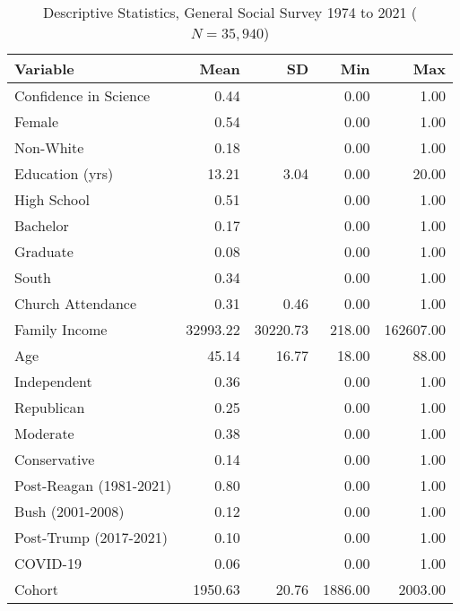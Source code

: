 \begin{table}[ht]
\centering
\caption{Descriptive Statistics, General Social Survey 1974 to 2021 ($N=35,940$)} 
\begin{tabular}{lrrrr}
  \toprule
Variable & Mean & SD & Min & Max \\ 
  \midrule
Confidence in Science & 0.44 &  & 0.00 & 1.00 \\ 
  Female & 0.54 &  & 0.00 & 1.00 \\ 
  Non-White & 0.18 &  & 0.00 & 1.00 \\ 
  Education (yrs) & 13.21 & 3.04 & 0.00 & 20.00 \\ 
  High School & 0.51 &  & 0.00 & 1.00 \\ 
  Bachelor & 0.17 &  & 0.00 & 1.00 \\ 
  Graduate & 0.08 &  & 0.00 & 1.00 \\ 
  South & 0.34 &  & 0.00 & 1.00 \\ 
  Church Attendance & 0.31 & 0.46 & 0.00 & 1.00 \\ 
  Family Income & 32993.22 & 30220.73 & 218.00 & 162607.00 \\ 
  Age & 45.14 & 16.77 & 18.00 & 88.00 \\ 
  Independent & 0.36 &  & 0.00 & 1.00 \\ 
  Republican & 0.25 &  & 0.00 & 1.00 \\ 
  Moderate & 0.38 &  & 0.00 & 1.00 \\ 
  Conservative & 0.14 &  & 0.00 & 1.00 \\ 
  Post-Reagan (1981-2021) & 0.80 &  & 0.00 & 1.00 \\ 
  Bush (2001-2008) & 0.12 &  & 0.00 & 1.00 \\ 
  Post-Trump (2017-2021) & 0.10 &  & 0.00 & 1.00 \\ 
  COVID-19 & 0.06 &  & 0.00 & 1.00 \\ 
  Cohort & 1950.63 & 20.76 & 1886.00 & 2003.00 \\ 
   \bottomrule
\end{tabular}
\end{table}
